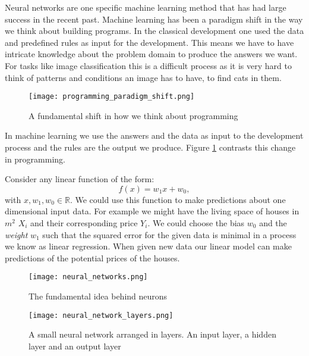Neural networks are one specific machine learning method that has had large success in the recent past. Machine learning has been a paradigm shift in the way we think about building programs. In the classical development one used the data and predefined rules as input for the development. This means we have to have intricate knowledge about the problem domain to produce the answers we want. For tasks like image classification this is a difficult process as it is very hard to think of patterns and conditions an image has to have, to find cats in them.

\begin{figure}
    \centering
    \texttt{[image: programming\_paradigm\_shift.png]}
    \caption{A fundamental shift in how we think about programming \cite[p. 5f.]{moroney_ai_2020}}
    \label{programming_paradigm_shift}
\end{figure}

In machine learning we use the answers and the data as input to the development process and the rules are the output we produce. Figure \ref{programming_paradigm_shift} contrasts this change in programming.

Consider any linear function of the form:
$$
    f(x) = w_1x + w_0,
$$
with $ x, w_1, w_0 \in \mathbb{R} $. We could use this function to make predictions about one dimensional input data. For example we might have the living space of houses in $ m^2 $ $ X_i $ and their corresponding price $ Y_i $. We could choose the bias $ w_0 $ and the \textit{weight} $ w_1 $ such that the squared error for the given data is minimal in a process we know as linear regression. When given new data our linear model can make predictions of the potential prices of the houses.


\begin{figure}
    \centering
    \texttt{[image: neural\_networks.png]}
    \caption{The fundamental idea behind neurons}
    \label{neural_network}
\end{figure}

\begin{figure}
    \centering
    \texttt{[image: neural\_network\_layers.png]}
    \caption{A small neural network arranged in layers. An input layer, a hidden layer and an output layer}
    \label{neural_network_layers}
\end{figure}

